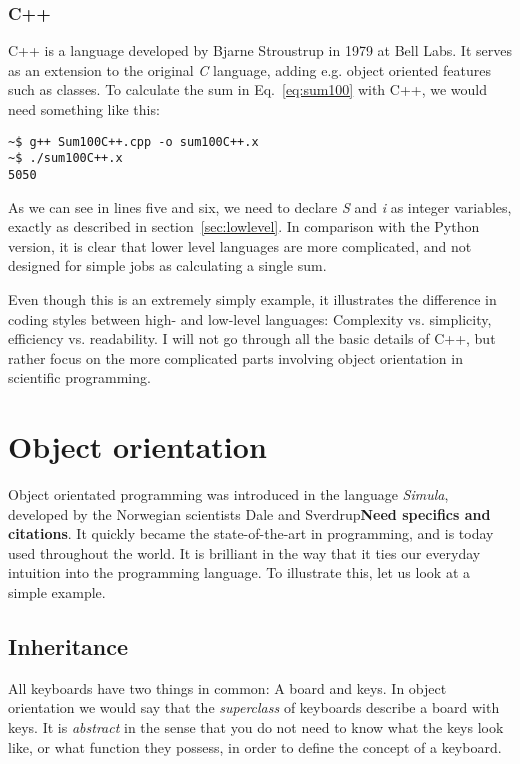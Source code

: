 \subsubsection{C++}

C++ is a language developed by Bjarne Stroustrup in 1979 at Bell Labs. It serves as an extension to the original \textit{C} language, adding e.g. object oriented features such as classes. To calculate the sum in Eq.~\ref{eq:sum100} with C++, we would need something like this:

\vspace{0.5 cm}


\begin{verbatim}
~$ g++ Sum100C++.cpp -o sum100C++.x
~$ ./sum100C++.x 
5050
\end{verbatim}


As we can see in lines five and six, we need to declare \textit{S} and \textit{i} as integer variables, exactly as described in section~\ref{sec:lowlevel}. In comparison with the Python version, it is clear that lower level languages are more complicated, and not designed for simple jobs as calculating a single sum.

Even though this is an extremely simply example, it illustrates the difference in coding styles between high- and low-level languages: Complexity vs. simplicity, efficiency vs. readability. I will not go through all the basic details of C++, but rather focus on the more complicated parts involving object orientation in scientific programming.


\section{Object orientation}

Object orientated programming was introduced in the language \textit{Simula}, developed by the Norwegian scientists Dale and Sverdrup\textbf{Need specifics and citations}. It quickly became the state-of-the-art in programming, and is today used throughout the world. It is brilliant in the way that it ties our everyday intuition into the programming language. To illustrate this, let us look at a simple example.

\subsection{Inheritance}

All keyboards have two things in common: A board and keys. In object orientation we would say that the \textit{superclass} of keyboards describe a board with keys. It is \textit{abstract} in the sense that you do not need to know what the keys look like, or what function they possess, in order to define the concept of a keyboard.

